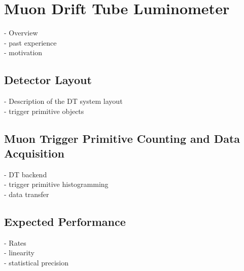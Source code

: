 \chapter{Muon Drift Tube Luminometer}

- Overview \\
- past experience \\
- motivation

\section{Detector Layout}
- Description of the DT system layout \\
- trigger primitive objects

\section{Muon Trigger Primitive Counting and Data Acquisition}
- DT backend \\
- trigger primitive histogramming \\
- data transfer

\section{Expected Performance}
- Rates \\ 
- linearity \\
- statistical precision 

\clearpage

